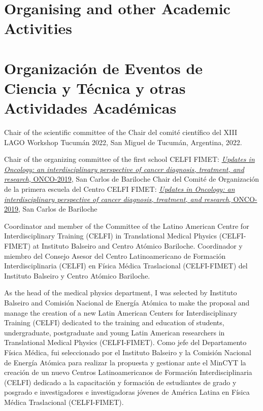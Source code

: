 \ifeng
\section*{Organising and other Academic Activities}
\else
\section*{Organización de Eventos de Ciencia y Técnica y otras Actividades Académicas}
\fi

\ifeng
Chair of the scientific committee of the
\else
Chair del comité científico del
\fi
XIII LAGO Workshop Tucumán 2022, San Miguel de Tucumán, Argentina, 2022.

\ifeng
Chair of the organizing committee of the first school CELFI FIMET: \href{https://fisica.cab.cnea.gov.ar/fisicamedica/celfi-oncology/}{{\emph{Updates in Oncology: an interdisciplinary perspective of cancer diagnosis, treatment, and research}}, ONCO-2019}, San Carlos de Bariloche
\else
Chair del Comité de Organización de la primera escuela del Centro CELFI FIMET: \href{https://fisica.cab.cnea.gov.ar/fisicamedica/celfi-oncology/}{{\emph{Updates in Oncology: an interdisciplinary perspective of cancer diagnosis, treatment, and research}}, ONCO-2019}, San Carlos de Bariloche
\fi

\ifeng
Coordinator and member of the Committee of the Latino American Centre for Interdisciplinary Training (CELFI) in Translational Medical Physics (CELFI-FIMET) at Instituto Balseiro and Centro Atómico Bariloche.
\else
Coordinador y miembro del Consejo Asesor del Centro Latinoamericano de Formación Interdisciplinaria (CELFI) en Física Médica Traslacional (CELFI-FIMET) del Instituto Balseiro y Centro Atómico Bariloche.
\fi

\ifeng
As the head of the medical physics department, I was selected by Instituto Balseiro and Comisión Nacional de Energía Atómica to make the proposal and manage the creation of a new Latin American Centers for Interdisciplinary Training (CELFI) dedicated to the training and education of students, undergraduate, postgraduate and young Latin American researchers in Translational Medical Physics (CELFI-FIMET).
\else
Como jefe del Departamento Física Médica, fui seleccionado por el Instituto Balseiro y la Comisión Nacional de Energía Atómica para realizar la propuesta y gestionar ante el MinCYT la creación de un nuevo Centros Latinoamericanos de Formación Interdisciplinaria (CELFI) dedicado a la capacitación y formación de estudiantes de grado y posgrado e investigadores e investigadoras jóvenes de América Latina en Física Médica Traslacional (CELFI-FIMET).
\fi

